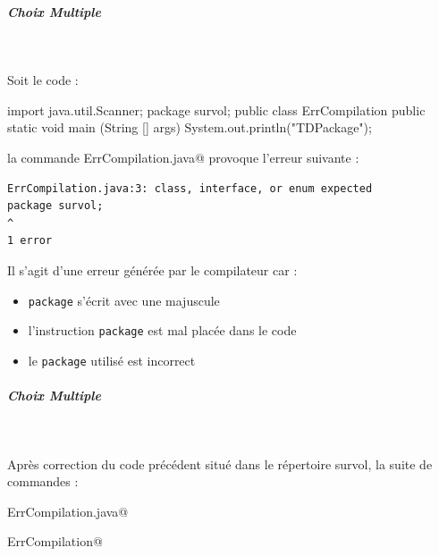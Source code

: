 \documentclass[11pt,a4paper]{article}
\begin{document}
			
		\subparagraph{Choix Multiple } 
		
                \textcolor{white}{.} \par
            Soit le code :
            \par
        \begin{Java}
import java.util.Scanner;
package survol;
public class ErrCompilation{
	public static void main (String [] args){
		System.out.println("TDPackage");
	}
}							\end{Java}
								la commande \verb@javac ErrCompilation.java@ provoque l'erreur suivante :
							
            \par
        \begin{scriptsize}\begin{verbatim}
ErrCompilation.java:3: class, interface, or enum expected
package survol;
^
1 error
							\end{verbatim}\end{scriptsize}
								Il s'agit d'une erreur g\'en\'er\'ee par le compilateur \verb@javac@ car :
							
            \par
        
            \begin{itemize} 
        
            \item[ \ding{"6D} ] \verb|package| s'\'ecrit avec une majuscule
        
            \item[ \ding{"6D} ] l'instruction \verb|package| est mal plac\'ee dans le code
        
            \item[ \ding{"6D} ] le \verb|package| utilis\'e est incorrect
        
            \end{itemize} 
        
			
		\subparagraph{Choix Multiple } 
		
                \textcolor{white}{.} \par
            
							  Apr\`es correction du code pr\'ec\'edent situ\'e dans le r\'epertoire survol,
							  la suite de commandes :
              
            \par
        \verb@javac ErrCompilation.java@
            \par
        \verb@java ErrCompilation@
            \par
        
\end{document}
